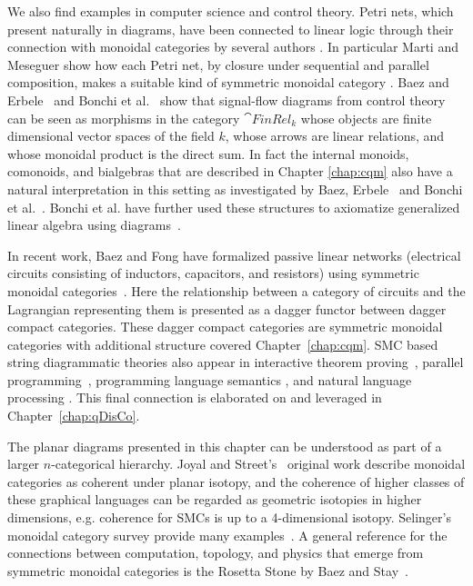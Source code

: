 We also find examples in computer science and control theory. Petri nets, which present naturally in diagrams, have been connected to linear logic through their connection with monoidal categories by several authors \cite{abramsky2008petri,marti1989petri,sassone1998axiomatization}. In particular Marti and Meseguer show how each Petri net, by closure under sequential and parallel composition, makes a suitable kind of symmetric monoidal category \cite{marti1989petri,meseguer1990petri}. Baez and Erbele~\cite{baez2014categories} and Bonchi et al.~\cite{bonchi2014interacting} show that signal-flow diagrams from control theory can be seen as morphisms in the category $\cat{FinRel_k}$ whose objects are finite dimensional vector spaces of the field $k$, whose arrows are linear relations, and whose monoidal product is the direct sum.  In fact the internal monoids, comonoids, and bialgebras that are described in Chapter \ref{chap:cqm} also have a natural interpretation in this setting as investigated by Baez, Erbele~\cite{baez2014categories} and Bonchi et al.~\cite{bonchi2015full}. Bonchi et al. have further used these structures to axiomatize generalized linear algebra using diagrams~\cite{bonchi2014interacting}.
 
In recent work, Baez and Fong have formalized passive linear networks (electrical circuits consisting of inductors, capacitors, and resistors) using symmetric monoidal categories~\cite{baez2015compositional}. Here the relationship between a category of circuits and the Lagrangian representing them is presented as a dagger functor between dagger compact categories. These dagger compact categories are symmetric monoidal categories with additional structure covered Chapter~\ref{chap:cqm}. SMC based string diagrammatic theories also appear in interactive theorem proving~\cite{grov2014tinker}, parallel programming~\cite{michaelson2012reasoning}, programming language semantics \cite{mellies2014local}, and natural language processing \cite{coecke2010mathematical}. This final connection is elaborated on and leveraged in Chapter~\ref{chap:qDisCo}.

The planar diagrams presented in this chapter can be understood as part of a larger $n$-categorical hierarchy. Joyal and Street's~\cite{joyal1991geometry} original work describe monoidal categories as coherent under planar isotopy, and the coherence of higher classes of these graphical languages can be regarded as geometric isotopies in higher dimensions, e.g. coherence for SMCs is up to a 4-dimensional isotopy. Selinger's monoidal category survey provide many examples~\cite{selinger2011survey}. A general reference for the connections between computation, topology, and physics that emerge from symmetric monoidal categories is the Rosetta Stone by Baez and Stay~\cite{baez2011physics}.

